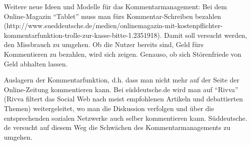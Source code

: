 Weitere neue Ideen und Modelle für das Kommentarmanagement:
Bei dem Online-Magazin ``Tablet'' muss man fürs Kommentar-Schreiben bezahlen (http://www.sueddeutsche.de/\-me\-dien/onlinemagazin-mit-kostenpflichter-kommentarfunktion-trolle-zur-kasse-bitte-1.2351918).
Damit soll versucht werden, den Missbrauch zu umgehen. Ob die Nutzer bereits sind, Geld fürs Kommentieren zu bezahlen, wird sich zeigen. Genauso, ob sich Störenfriede von Geld abhalten lassen.


Auslagern der Kommentarfunktion, d.h. dass man nicht mehr auf der Seite der Online-Zeitung kommentieren kann. Bei süddeutsche.de wird man auf ``Rivva'' (Rivva filtert das Social Web nach meist empfohlenen Artikeln und debattierten Themen) weitergeleitet, wo man die Diskussion verfolgen und über die entsprechenden sozialen Netzwerke auch selber kommentieren kann. Süddeutsche. de versucht auf diesem Weg die Schwächen des Kommentarmanagements zu umgehen. 

